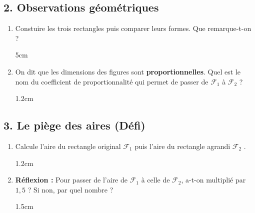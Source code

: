 \documentclass[a4paper]{book}
\begin{document}
    \subsection*{2. Observations géométriques}
    
    \begin{enumerate}[label=\alph*)]
        \item Constuire les trois rectangles puis comparer leurs formes. Que remarque-t-on ?
        \begin{ZoneReponse}{5cm}
        \end{ZoneReponse}
        
        \item On dit que les dimensions des figures sont \textbf{proportionnelles}. Quel est le nom du coefficient de proportionnalité qui permet de passer de $\mathcal{F}_1$ à $\mathcal{F}_2$ ?
        \begin{ZoneReponse}{1.2cm}
        \end{ZoneReponse}
    \end{enumerate}
    
    \subsection*{3. Le piège des aires (Défi)}
    
    \begin{enumerate}        
        \item Calcule l'aire du rectangle original $\mathcal{F}_1$ puis l'aire du rectangle agrandi $\mathcal{F}_2$ .
        \begin{ZoneReponse}{1.2cm}
        \end{ZoneReponse}
        
        \item \textbf{Réflexion :} Pour passer de l'aire de $\mathcal{F}_1$ à celle de $\mathcal{F}_2$, a-t-on multiplié par $1,5$ ? Si non, par quel nombre ?
        \begin{ZoneReponse}{1.5cm}
        \end{ZoneReponse}
    \end{enumerate}
\end{document}

